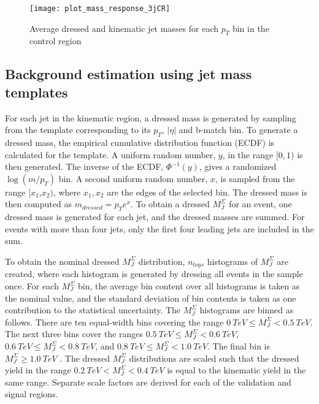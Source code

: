 \begin{figure}[!ht]
    \centering
    \texttt{[image: plot\_mass\_response\_3jCR]}
    \centering
    \caption{Average dressed and kinematic jet masses for each $p_T$ bin
    in the control region}
    \label{fig:response_3jCR}

\end{figure}

\subsection{Background estimation using jet mass templates}\label{subsec:template_method}

For each jet in the kinematic region, a dressed mass is generated by sampling from the template corresponding to its $p_T$, $|\eta|$ and b-match bin.
To generate a dressed mass, the empirical cumulative distribution function (ECDF) is calculated for the template.
A uniform random number, $y$, in the range $[0,1)$ is then generated.
The inverse of the ECDF, $\Phi^{-1}(y)$, gives a randomized $\log\left(m/p_T\right)$ bin.
A second uniform random number, $x$, is sampled from the range $[x_1$,$x_2)$, where $x_1,x_2$ are the edges of the selected bin.
The dressed mass is then computed as $m_{dressed} = p_{T}e^x$.
To obtain a dressed $M_{J}^{\Sigma}$ for an event, one dressed mass is generated for each jet, and the dressed masses are summed.
For events with more than four jets, only the first four leading jets are included in the sum.

To obtain the nominal dressed $M_{J}^{\Sigma}$ distribution, $n_{toys}$ histograms of $M_{J}^{\Sigma}$ are created, where each histogram is generated by dressing all events in the sample once.
For each $M_{J}^{\Sigma}$ bin, the average bin content over all histograms is taken as the nominal value, and the standard deviation of bin contents is taken as one contribution to the statistical uncertainty.
The $M_{J}^{\Sigma}$ histograms are binned as follows.
There are ten equal-width bins covering the range $0~TeV \leq M_{J}^{\Sigma} < 0.5~TeV$.
The next three bins cover the ranges $0.5~TeV \leq M_{J}^{\Sigma} < 0.6~TeV$, $0.6~TeV \leq M_{J}^{\Sigma} < 0.8~TeV$, and $0.8~TeV \leq M_{J}^{\Sigma} < 1.0~TeV$.
The final bin is $M_{J}^{\Sigma} \geq 1.0~TeV$ .
The dressed $M_{J}^{\Sigma}$ distributions are scaled such that the dressed yield in the range  $0.2~TeV < M_{J}^{\Sigma} < 0.4~TeV$ is equal to the kinematic yield in the same range.
Separate scale factors are derived for each of the validation and signal regions.

